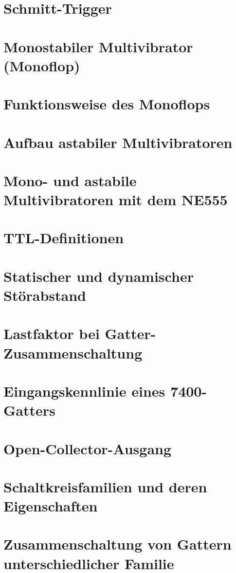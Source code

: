 \documentclass[a4paper, 11pt]{article}
\begin{document}
  
  \clearpage
  \setcounter{page}{1}

\section{Schmitt-Trigger}


\section{Monostabiler Multivibrator (Monoflop)}


\section{Funktionsweise des Monoflops}


\section{Aufbau astabiler Multivibratoren}


\section{Mono- und astabile Multivibratoren mit dem NE555}

\section{TTL-Definitionen}

\section{Statischer und dynamischer Störabstand}

\section{Lastfaktor bei Gatter-Zusammenschaltung}

\section{Eingangskennlinie eines 7400-Gatters}

\section{Open-Collector-Ausgang}

\section{Schaltkreisfamilien und deren Eigenschaften}

\section{Zusammenschaltung von Gattern unterschiedlicher Familie}
\end{document}
